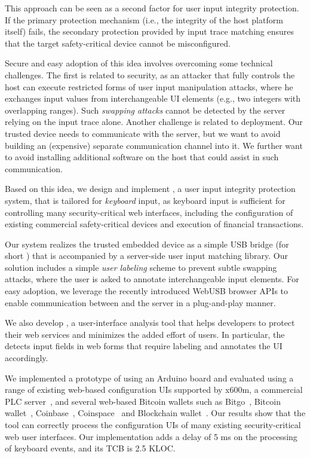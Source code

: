 This approach can be seen as a second factor for user input integrity protection. If the primary protection mechanism (i.e., the integrity of the host platform itself) fails, the secondary protection provided by input trace matching ensures that the target safety-critical device cannot be misconfigured.

Secure and easy adoption of this idea involves overcoming some technical challenges. The first is related to security, as an attacker that fully controls the host can execute restricted forms of user input manipulation attacks, where he exchanges input values from interchangeable UI elements (e.g., two integers with overlapping ranges). Such \emph{swapping attacks} cannot be detected by the server relying on the input trace alone. Another challenge is related to deployment. Our trusted device needs to communicate with the server, but we want to avoid building an (expensive) separate communication channel into it. We further want to avoid installing additional software on the host that could assist in such communication. 


 Based on this idea, we design and implement \name, a user input integrity protection system, that is tailored for \emph{keyboard} input, as keyboard input is sufficient for controlling many security-critical web interfaces, including the configuration of existing commercial safety-critical devices and execution of financial transactions.

Our system realizes the trusted embedded device as a simple USB bridge (for short \device) that is accompanied by a server-side user input matching library. Our solution includes a simple \emph{user labeling} scheme to prevent subtle swapping attacks, where the user is asked to annotate interchangeable input elements. For easy adoption, we leverage the recently introduced WebUSB browser APIs to enable communication between \device and the server in a plug-and-play manner. 

We also develop \tool, a user-interface analysis tool that helps developers to protect their web services and minimizes the added effort of users. In particular, the \tool detects input fields in web forms that require labeling and annotates the UI accordingly. 

We implemented a prototype of \device using an Arduino board and evaluated \tool using a range of existing web-based configuration UIs supported by x600m, a commercial PLC server~\cite{controlbyweb}, and several web-based Bitcoin wallets such as Bitgo~\cite{bitgo}, Bitcoin wallet~\cite{bitcoinwallet}, Coinbase~\cite{coinbase}, Coinspace~\cite{coin} and Blockchain wallet~\cite{blockchain}. Our results show that the tool can correctly process the configuration UIs of many existing security-critical web user interfaces. Our \device implementation adds a delay of 5 ms on the processing of keyboard events, and its TCB is 2.5 KLOC. 


